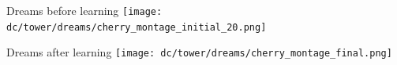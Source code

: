 \documentclass{beamer}
\begin{document}
\begin{frame}{Dreams before learning}
  \texttt{[image: dc/tower/dreams/cherry\_montage\_initial\_20.png]}
\end{frame}

\begin{frame}{Dreams after learning}
  \texttt{[image: dc/tower/dreams/cherry\_montage\_final.png]}
  \end{frame}

\end{document}
